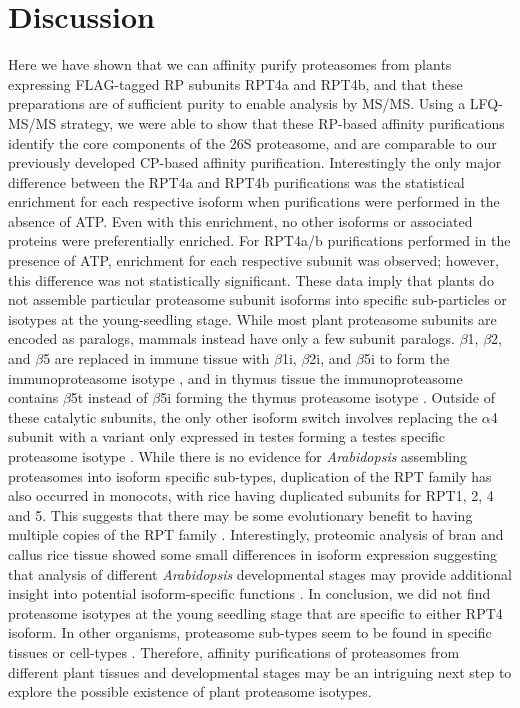 \section{Discussion}
 	Here we have shown that we can affinity purify proteasomes from plants expressing FLAG-tagged RP subunits RPT4a and RPT4b, and that these preparations are of sufficient purity to enable analysis by MS/MS.  Using a LFQ-MS/MS strategy, we were able to show that these RP-based affinity purifications identify the core components of the 26S proteasome, and are comparable to our previously developed CP-based affinity purification. Interestingly the only major difference between the RPT4a and RPT4b purifications was the statistical enrichment for each respective isoform when purifications were performed in the absence of ATP. Even with this enrichment, no other isoforms or associated proteins were preferentially enriched. For RPT4a/b purifications performed in the presence of ATP, enrichment for each respective subunit was observed; however, this difference was not statistically significant. These data imply that plants do not assemble particular proteasome subunit isoforms into specific sub-particles or isotypes at the young-seedling stage. While most plant proteasome subunits are encoded as paralogs, mammals instead have only a few subunit paralogs. $\beta$1, $\beta$2, and $\beta$5 are replaced in immune tissue with $\beta$1i, $\beta$2i, and $\beta$5i to form the immunoproteasome isotype \citep{nandi96}, and in thymus tissue the immunoproteasome contains $\beta$5t instead of $\beta$5i forming the thymus proteasome isotype \citep{murata07}. Outside of these catalytic subunits, the only other isoform switch involves replacing the $\alpha$4 subunit with a variant only expressed in testes forming a testes specific proteasome isotype \citep{belote98, uechi14}.   While there is no evidence for \textit{Arabidopsis} assembling proteasomes into isoform specific sub-types, duplication of the RPT family has also occurred in monocots, with rice having duplicated subunits for RPT1, 2, 4 and 5. This suggests that there may be some evolutionary benefit to having multiple copies of the RPT family \citep{shibahara04}. Interestingly, proteomic analysis of bran and callus rice tissue showed some small differences in isoform expression suggesting that analysis of different \textit{Arabidopsis} developmental stages may provide additional insight into potential isoform-specific functions \citep{shibahara04}. In conclusion, we did not find proteasome isotypes at the young seedling stage that are specific to either RPT4 isoform. In other organisms, proteasome sub-types seem to be found in specific tissues or cell-types \citep{belote98, murata07, nandi96, uechi14}. Therefore, affinity purifications of proteasomes from different plant tissues and developmental stages may be an intriguing next step to explore the possible existence of plant proteasome isotypes.
 	
